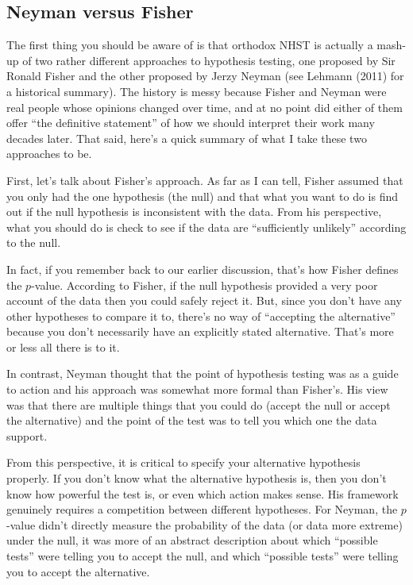 \documentclass[
  a4paper,
]{book}
\begin{document}
\subsection{Neyman versus Fisher}\label{neyman-versus-fisher}

The first thing you should be aware of is that orthodox NHST is actually
a mash-up of two rather different approaches to hypothesis testing, one
proposed by Sir Ronald Fisher and the other proposed by Jerzy Neyman
(see Lehmann (2011) for a historical summary). The history is messy
because Fisher and Neyman were real people whose opinions changed over
time, and at no point did either of them offer ``the definitive
statement'' of how we should interpret their work many decades later.
That said, here's a quick summary of what I take these two approaches to
be.

First, let's talk about Fisher's approach. As far as I can tell, Fisher
assumed that you only had the one hypothesis (the null) and that what
you want to do is find out if the null hypothesis is inconsistent with
the data. From his perspective, what you should do is check to see if
the data are ``sufficiently unlikely'' according to the null.

In fact, if you remember back to our earlier discussion, that's how
Fisher defines the \(p\)-value. According to Fisher, if the null
hypothesis provided a very poor account of the data then you could
safely reject it. But, since you don't have any other hypotheses to
compare it to, there's no way of ``accepting the alternative'' because
you don't necessarily have an explicitly stated alternative. That's more
or less all there is to it.

In contrast, Neyman thought that the point of hypothesis testing was as
a guide to action and his approach was somewhat more formal than
Fisher's. His view was that there are multiple things that you could do
(accept the null or accept the alternative) and the point of the test
was to tell you which one the data support.

From this perspective, it is critical to specify your alternative
hypothesis properly. If you don't know what the alternative hypothesis
is, then you don't know how powerful the test is, or even which action
makes sense. His framework genuinely requires a competition between
different hypotheses. For Neyman, the \(p\)-value didn't directly
measure the probability of the data (or data more extreme) under the
null, it was more of an abstract description about which ``possible
tests'' were telling you to accept the null, and which ``possible
tests'' were telling you to accept the alternative.
\end{document}
